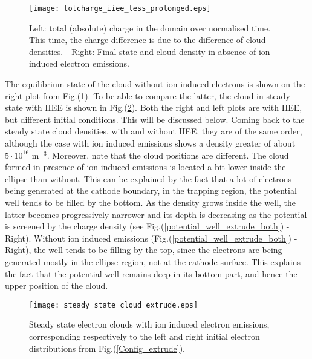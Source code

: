 \begin{figure}[h!]
\centering
	\texttt{[image: totcharge\_iiee\_less\_prolonged.eps]}
	\caption{\label{totcharge_iiee_less} Left: total (absolute) charge in the domain over normalised time. This time, the charge difference is due to the difference of cloud densities. - Right: Final state and cloud density in absence of ion induced electron emissions.}
\end{figure}

\noindent The equilibrium state of the cloud without ion induced electrons is shown on the right plot from Fig.(\ref{totcharge_iiee_less}). To be able to compare the latter, the cloud in steady state with IIEE is shown in Fig.(\ref{steady_state_cloud_extrude}). Both the right and left plots are with IIEE, but different initial conditions. This will be discussed below. Coming back to the steady state cloud densities, with and without IIEE, they are of the same order, although the case with ion induced emissions shows a density greater of about $5\cdot 10^{16}$ m$^{-3}$. Moreover, note that the cloud positions are different. The cloud formed in presence of ion induced emissions is located a bit lower inside the ellipse than without. This can be explained by the fact that a lot of electrons being generated at the cathode boundary, in the trapping region, the potential well tends to be filled by the bottom. As the density grows inside the well, the latter becomes progressively narrower and its depth is decreasing as the potential is screened by the charge density (see Fig.(\ref{potential_well_extrude_both}) - Right). Without ion induced emissions (Fig.(\ref{potential_well_extrude_both}) - Right), the well tends to be filling by the top, since the electrons are being generated mostly in the ellipse region, not at the cathode surface. This explains the fact that the potential well remains deep in its bottom part, and hence the upper position of the cloud.\\

\begin{figure}[h!]
\centering
	\texttt{[image: steady\_state\_cloud\_extrude.eps]}
	\caption{\label{steady_state_cloud_extrude} Steady state electron clouds with ion induced electron emissions, corresponding respectively to the left and right initial electron distributions from Fig.(\ref{Config_extrude}).}
\end{figure}

